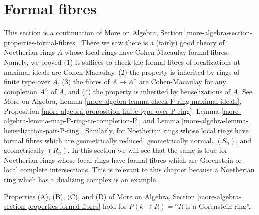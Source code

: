 \section{Formal fibres}
\label{section-formal-fibres}

\noindent
This section is a continuation of
More on Algebra, Section \ref{more-algebra-section-properties-formal-fibres}.
There we saw there is a (fairly) good theory of Noetherian rings $A$
whose local rings have Cohen-Macaulay formal fibres. Namely, we proved
(1) it suffices to check the formal fibres of localizations at
maximal ideals are Cohen-Macaulay,
(2) the property is inherited by rings of finite type over $A$,
(3) the fibres of $A \to A^\wedge$ are Cohen-Macaulay for
any completion $A^\wedge$ of $A$, and
(4) the property is inherited by henselizations of $A$. See
More on Algebra, Lemma \ref{more-algebra-lemma-check-P-ring-maximal-ideals},
Proposition \ref{more-algebra-proposition-finite-type-over-P-ring},
Lemma \ref{more-algebra-lemma-map-P-ring-to-completion-P}, and
Lemma \ref{more-algebra-lemma-henselization-pair-P-ring}.
Similarly, for Noetherian rings whose local rings have formal fibres
which are geometrically reduced, geometrically normal, $(S_n)$, and
geometrically $(R_n)$.
In this section we will see that the same is true for Noetherian rings
whose local rings have formal fibres which are Gorenstein
or local complete intersections.
This is relevant to this chapter because a Noetherian ring which has a
dualizing complex is an example.

\begin{lemma}
\label{lemma-formal-fibres-gorenstein}
Properties (A), (B), (C), and (D) of
More on Algebra, Section \ref{more-algebra-section-properties-formal-fibres}
hold for $P(k \to R) =$``$R$ is a Gorenstein ring''.
\end{lemma}

